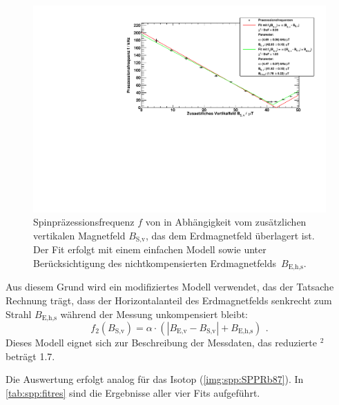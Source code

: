 \begin{figure}[H]
    \begin{center}
        \includegraphics[width=\textwidth]{../img/part4/Rb85.pdf}
        \caption{Spinpräzessionsfrequenz $f$ von  in Abhängigkeit
        vom zusätzlichen vertikalen Magnetfeld $B_\text{S,v}$, das dem Erdmagnetfeld überlagert ist.
        Der Fit erfolgt mit einem einfachen Modell sowie unter Berücksichtigung des
        nichtkompensierten Erdmagnetfelds~$B_\text{E,h,s}$.}
        \label{img:spp:SPPRb85}
    \end{center}
\end{figure}

Aus diesem Grund wird ein modifiziertes Modell verwendet, das der Tatsache Rechnung trägt,
dass der Horizontalanteil des Erdmagnetfelds senkrecht zum Strahl $B_\text{E,h,s}$
während der Messung unkompensiert bleibt:
\begin{equation}
    f_2(B_\text{S,v})=\alpha \cdot (|B_\text{E,v}-B_\text{S,v}| + B_\text{E,h,s}) \ \, .
\end{equation}
Dieses Modell eignet sich zur Beschreibung der Messdaten, das reduzierte \textchi$^2$ beträgt 1.7.

Die Auswertung erfolgt analog für das Isotop  (\autoref{img:spp:SPPRb87}).
In \autoref{tab:spp:fitres} sind die Ergebnisse aller vier Fits aufgeführt.

